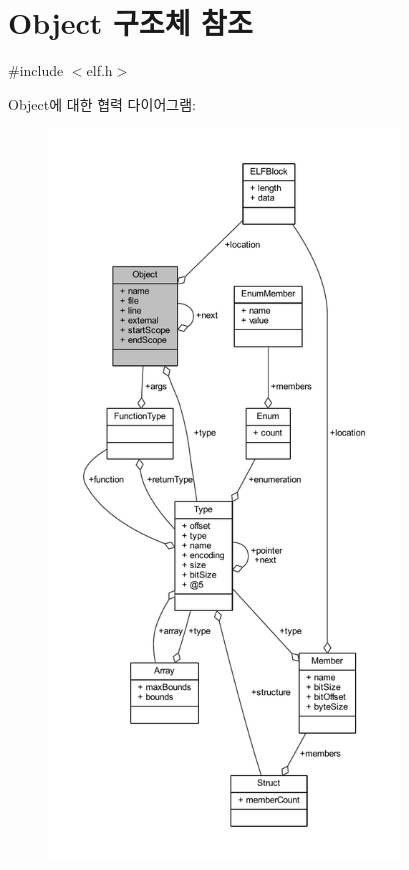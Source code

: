 \hypertarget{struct_object}{}\section{Object 구조체 참조}
\label{struct_object}


{\ttfamily \#include $<$elf.\+h$>$}



Object에 대한 협력 다이어그램\+:\nopagebreak
\begin{figure}[H]
\begin{center}
\leavevmode
\includegraphics[height=550pt]{struct_object__coll__graph}
\end{center}
\end{figure}

